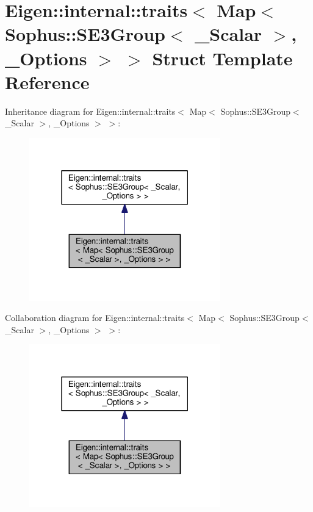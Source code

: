 \hypertarget{struct_eigen_1_1internal_1_1traits_3_01_map_3_01_sophus_1_1_s_e3_group_3_01___scalar_01_4_00_01___options_01_4_01_4}{}\section{Eigen\+:\+:internal\+:\+:traits$<$ Map$<$ Sophus\+:\+:S\+E3\+Group$<$ \+\_\+\+Scalar $>$, \+\_\+\+Options $>$ $>$ Struct Template Reference}
\label{struct_eigen_1_1internal_1_1traits_3_01_map_3_01_sophus_1_1_s_e3_group_3_01___scalar_01_4_00_01___options_01_4_01_4}


Inheritance diagram for Eigen\+:\+:internal\+:\+:traits$<$ Map$<$ Sophus\+:\+:S\+E3\+Group$<$ \+\_\+\+Scalar $>$, \+\_\+\+Options $>$ $>$\+:
\nopagebreak
\begin{figure}[H]
\begin{center}
\leavevmode
\includegraphics[width=235pt]{struct_eigen_1_1internal_1_1traits_3_01_map_3_01_sophus_1_1_s_e3_group_3_01___scalar_01_4_00_01_7c582174955688be9f4d161a19f89577}
\end{center}
\end{figure}


Collaboration diagram for Eigen\+:\+:internal\+:\+:traits$<$ Map$<$ Sophus\+:\+:S\+E3\+Group$<$ \+\_\+\+Scalar $>$, \+\_\+\+Options $>$ $>$\+:
\nopagebreak
\begin{figure}[H]
\begin{center}
\leavevmode
\includegraphics[width=235pt]{struct_eigen_1_1internal_1_1traits_3_01_map_3_01_sophus_1_1_s_e3_group_3_01___scalar_01_4_00_01_2a0483a3750a0ceb59dc03e56a24ed74}
\end{center}
\end{figure}
